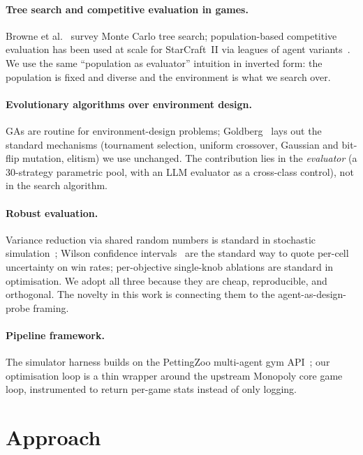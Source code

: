 \documentclass[10pt]{article}
\begin{document}
\paragraph{Tree search and competitive evaluation in games.}
Browne et al.~\cite{browne_mcts} survey Monte Carlo tree search;
population-based competitive evaluation has been used at scale for
StarCraft~II via leagues of agent variants~\cite{alphastar}. We use
the same ``population as evaluator'' intuition in inverted form:
the population is fixed and diverse and the environment is what we
search over.

\paragraph{Evolutionary algorithms over environment design.}
GAs are routine for environment-design problems;
Goldberg~\cite{ga-goldberg} lays out the standard mechanisms
(tournament selection, uniform crossover, Gaussian and bit-flip
mutation, elitism) we use unchanged. The contribution lies in the
\emph{evaluator} (a 30-strategy parametric pool, with an LLM
evaluator as a cross-class control), not in the search algorithm.

\paragraph{Robust evaluation.} Variance reduction via shared random
numbers is standard in stochastic simulation~\cite{crn}; Wilson
confidence intervals~\cite{wilson} are the standard way to quote
per-cell uncertainty on win rates; per-objective single-knob
ablations are standard in optimisation. We adopt all three because
they are cheap, reproducible, and orthogonal. The novelty in this
work is connecting them to the agent-as-design-probe framing.

\paragraph{Pipeline framework.} The simulator harness builds on the
PettingZoo multi-agent gym API~\cite{pettingzoo}; our optimisation
loop is a thin wrapper around the upstream Monopoly core game loop,
instrumented to return per-game stats instead of only logging.

\section{Approach}\label{sec:approach}
\end{document}
